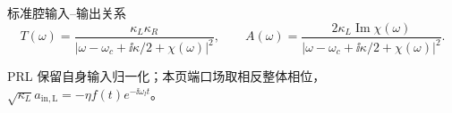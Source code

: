 \begin{frame}{标准腔输入--输出关系}
  \vspace{0.4em}
  \[
    T(\omega)=\frac{\kappa_L\kappa_R}
      {|\omega-\omega_c+\ii\kappa/2+\chi(\omega)|^2},
    \qquad
    A(\omega)=\frac{2\kappa_L\operatorname{Im}\chi(\omega)}
      {|\omega-\omega_c+\ii\kappa/2+\chi(\omega)|^2}.
  \]

  {\fontsize{6.3}{7.4}\selectfont\color{gray}
    PRL 保留自身输入归一化；本页端口场取相反整体相位，
    $\sqrt{\kappa_L}a_{\mathrm{in,L}}=-\eta f(t)e^{-\ii\omega_l t}$。
  }

\end{frame}
